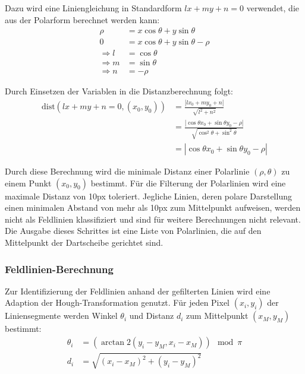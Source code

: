 Dazu wird eine Liniengleichung in Standardform $ lx + my + n = 0 $ verwendet, die aus der Polarform berechnet werden kann:
\begin{align*}
    \rho          & = x \cos{\theta} + y \sin{\theta}        \\
    0             & = x \cos{\theta} + y \sin{\theta} - \rho \\
    \Rightarrow l & = \cos{\theta}                           \\
    \Rightarrow m & = \sin{\theta}                           \\
    \Rightarrow n & = -\rho
\end{align*}

Durch Einsetzen der Variablen in die Distanzberechnung folgt:
\begin{align*}
    \text{dist}(lx + my + n = 0, (x_0, y_0)) & = \frac{| l x_0 + m y_0 + n|}{\sqrt{l^2+n^2}}                                                   \\
                                             & = \frac{| \cos{\theta} x_0 + \sin{\theta} y_0 - \rho |}{\sqrt{\cos^2{\theta} + \sin^2{\theta}}} \\
                                             & = | \cos{\theta} x_0 + \sin{\theta} y_0 - \rho |
\end{align*}

Durch diese Berechnung wird die minimale Distanz einer Polarlinie $(\rho, \theta)$ zu einem Punkt $(x_0, y_0)$ bestimmt. Für die Filterung der Polarlinien wird eine maximale Distanz von 10px toleriert. Jegliche Linien, deren polare Darstellung einen minimalen Abstand von mehr als 10px zum Mittelpunkt aufweisen, werden nicht als Feldlinien klassifiziert und sind für weitere Berechnungen nicht relevant. Die Ausgabe dieses Schrittes ist eine Liste von Polarlinien, die auf den Mittelpunkt der Dartscheibe gerichtet sind.

\subsubsection{Feldlinien-Berechnung}
\label{sec:impl:cv:lines:fields}

Zur Identifizierung der Feldlinien anhand der gefilterten Linien wird eine Adaption der Hough-Transformation genutzt. Für jeden Pixel $(x_i, y_i)$ der Liniensegmente werden Winkel $\theta_i$ und Distanz $d_i$ zum Mittelpunkt $(x_M, y_M)$ bestimmt:
\begin{align*}
    \theta_i & =(\arctan2{(y_i - y_M, x_i - x_M)}) \mod \pi \\
    d_i      & =\sqrt{(x_i - x_M)^2+(y_i - y_M)^2}
\end{align*}

